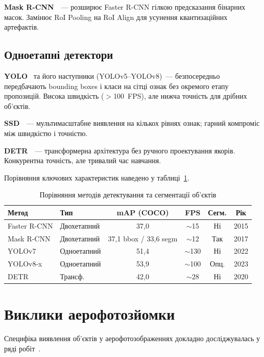 \documentclass[14pt,a4paper]{extreport}
\begin{document}
\textbf{Mask R-CNN}~\cite{maskrcnn2017}~--- розширює Faster R-CNN гілкою
предсказання бінарних масок. Замінює RoI Pooling на RoI Align для
усунення квантизаційних артефактів.

\subsection*{Одноетапні детектори}

\textbf{YOLO}~\cite{yolo2016} та його наступники (YOLOv5--YOLOv8)~---
безпосередньо передбачають bounding boxes і класи на сітці ознак без
окремого етапу пропозицій. Висока швидкість ($>$100~FPS), але нижча
точність для дрібних об'єктів.

\textbf{SSD}~\cite{ssd2016}~--- мультимасштабне виявлення на кількох
рівнях ознак; гарний компроміс між швидкістю і точністю.

\textbf{DETR}~\cite{detr2020}~--- трансформерна архітектура без ручного
проектування якорів. Конкурентна точність, але тривалий час навчання.

Порівняння ключових характеристик наведено у таблиці~\ref{tab:methods}.

\begin{table}[H]
\caption{Порівняння методів детектування та сегментації об'єктів}
\label{tab:methods}
\centering
\begin{tabularx}{\textwidth}{@{}lXcccc@{}}
\toprule
Метод & Тип & mAP (COCO) & FPS & Сегм. & Рік \\
\midrule
Faster R-CNN & Двохетапний & 37{,}0 & $\sim$15 & Ні & 2015 \\
Mask R-CNN   & Двохетапний & 37{,}1 bbox / 33{,}6 segm & $\sim$12 & Так & 2017 \\
YOLOv7       & Одноетапний & 51{,}4 & $\sim$130 & Ні & 2022 \\
YOLOv8-x     & Одноетапний & 53{,}9 & $\sim$100 & Опц. & 2023 \\
DETR         & Трансф. & 42{,}0 & $\sim$28 & Ні & 2020 \\
\bottomrule
\end{tabularx}
\end{table}

\section{Виклики аерофотозйомки}

Специфіка виявлення об'єктів у аерофото\-зображеннях докладно
досліджувалась у ряді робіт~\cite{liuUAVYOLO2020, azimiTracking2020,
avolaMS2021}.
\end{document}
